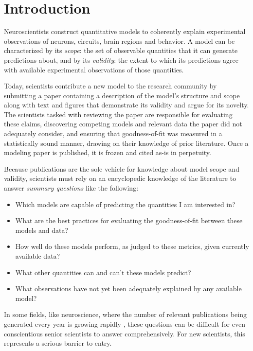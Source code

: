 \documentclass{frontiersSCNS}
\begin{document}
\section{Introduction}
Neuroscientists construct quantitative models to coherently explain experimental observations of neurons, circuits, brain regions and behavior. 
A model can be characterized by its \textit{scope}: the set of observable quantities that it can generate predictions about, and by its \textit{validity}: the extent to which its predictions agree with available experimental  observations of those quantities.

Today, scientists contribute a new model to the research community by submitting a paper containing a description of the model's structure and scope along with text and figures that demonstrate its validity and argue for its novelty.  
The scientists tasked with reviewing the paper are  responsible for evaluating these claims, discovering competing models and relevant data the paper did not adequately consider, and ensuring that goodness-of-fit was measured in a statistically sound manner, drawing on their knowledge of prior literature. Once a modeling paper is published, it is frozen and cited as-is in perpetuity. 

Because publications are the sole vehicle for knowledge about model scope and validity, scientists must rely on an encyclopedic knowledge of the literature to answer \emph{summary questions} like the following:
\begin{itemize}
\item Which models are capable of predicting the quantities I am interested in?
\item What are the best practices for evaluating the goodness-of-fit between these models and  data?
\item How well do these models perform, as judged to these metrics, given currently available data?
\item What other quantities can and can't these models predict?
\item What observations have not yet been adequately explained by any available model?
\end{itemize}

In some fields, like neuroscience, where the number of relevant publications being generated every year is growing rapidly \citep{jinha_article_2010}, these questions can be difficult for even conscientious senior scientists to answer comprehensively. For new scientists, this represents a serious barrier to entry. 
\end{document}
